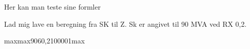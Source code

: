 \documentclass[a4paper,oneside,10pt,danish]{report}
\begin{document}
Her kan man teste sine formler

Lad mig lave en beregning fra SK til Z. Sk er angivet til 90 MVA ved RX 0,2. 

\begin{FraSkTilZ}{max}{max}{90}{6}{0,2}{10000}{1}{max}
\end{FraSkTilZ}
\end{document}
